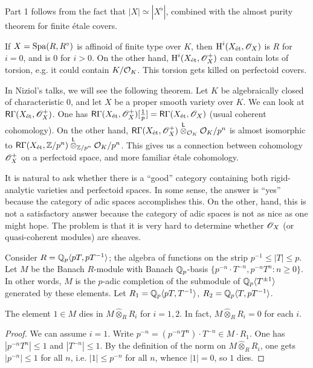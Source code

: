 \documentclass{article}
\begin{document}
Part 1 follows from the fact that $|X|\simeq |X^\flat|$, combined with the almost 
purity theorem for finite \'etale covers. 

If $X=\operatorname{Spa}(R,R^\circ)$ is affinoid of finite type over $K$, then 
$\operatorname{H}^i(X_{\textnormal{\'et}},\mathscr{O}_X)$ is $R$ for $i=0$, and is $0$ for $i>0$. On the other hand, 
$\operatorname{H}^i(X_{\textnormal{\'et}},\mathscr{O}_X^+)$ can contain lots of torsion, e.g. it could contain 
$K/ \mathcal{O}_K$. This torsion gets killed on perfectoid covers. 

In Niziol's talks, we will see the following theorem. Let $K$ be algebraically 
closed of characteristic $0$, and let $X$ be a proper smooth variety over $K$. 
We can look at $\mathsf R\Gamma(X_{\textnormal{\'et}},\mathscr{O}_X^+)$. One has 
$\mathsf R\Gamma(X_{\textnormal{\'et}},\mathscr{O}_X^+)[\frac 1 p] = \mathsf R\Gamma(X_{\textnormal{\'et}},\mathscr{O}_X)$ 
(usual coherent cohomology). On the other hand, 
$\mathsf R\Gamma(X_{\textnormal{\'et}},\mathscr{O}_X^+)\overset{\mathsf L}{\otimes}_{\mathcal{O}_K} \mathcal{O}_K/p^n$ is almost 
isomorphic to $\mathsf R\Gamma(X_{\textnormal{\'et}},\mathbb{Z}/p^n)\overset{\mathsf L}{\otimes}_{\mathbb{Z}/p^n} \mathcal{O}_K / p^n$. 
This gives us a connection between cohomology $\mathscr{O}_X^+$ on a perfectoid 
space, and more familiar \'etale cohomology. 

It is natural to ask whether there is a ``good'' category containing both 
rigid-analytic varieties and perfectoid spaces. In some sense, the answer is 
``yes'' because the category of adic spaces accomplishes this. On the other, 
hand, this is not a satisfactory answer because the category of adic spaces is 
not as nice as one might hope. The problem is that it is very hard to determine 
whether $\mathscr{O}_X$ (or quasi-coherent modules) are sheaves.  

\begin{example}
Consider $R=\mathbb{Q}_p\langle p T, p T^{-1}\rangle$; the algebra of functions on the 
strip $p^{-1}\leqslant |T|\leqslant p$. Let $M$ be the Banach $R$-module with 
Banach $\mathbb{Q}_p$-basis $\{p^{-n}\cdot T^{-n}, p^{-n} T^n:n\geqslant 0\}$. In 
other words, $M$ is the $p$-adic completion of the submodule of 
$\mathbb{Q}_p\langle T^{\pm 1}\rangle$ generated by these elements. Let 
$R_1 = \mathbb{Q}_p\langle p T,T^{-1}\rangle$, 
$R_2 = \mathbb{Q}_p\langle T,p T^{-1}\rangle$. 
\end{example}

\begin{proposition}
The element $1\in M$ dies in $M\widehat\otimes_R R_i$ for $i=1,2$. In fact, 
$M\widehat\otimes_R R_i = 0$ for each $i$. 
\end{proposition}
\begin{proof}
We can assume $i=1$. Write $p^{-n} = (p^{-n} T^n)\cdot T^{-n} \in M\cdot R_1$. 
One has $|p^{-n} T^n|\leqslant 1$ and $|T^{-n}|\leqslant 1$. By the definition of 
the norm on $M\widehat\otimes_R R_i$, one gets 
$|p^{-n}|\leqslant 1$ for all $n$, i.e. 
$|1|\leqslant p^{-n}$ for all $n$, whence $|1|=0$, so $1$ dies. 
\end{proof}
\end{document}
